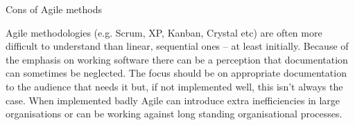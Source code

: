 Cons of Agile methods

Agile methodologies (e.g. Scrum, XP, Kanban, Crystal etc) are often more difficult to understand than linear, sequential ones – at least initially.
Because of the emphasis on working software there can be a perception that documentation can sometimes be neglected. The focus should be on appropriate documentation to the audience that needs it but, if not implemented well, this isn’t always the case.
When implemented badly Agile can introduce extra inefficiencies in large organisations or can be working against long standing organisational processes.

